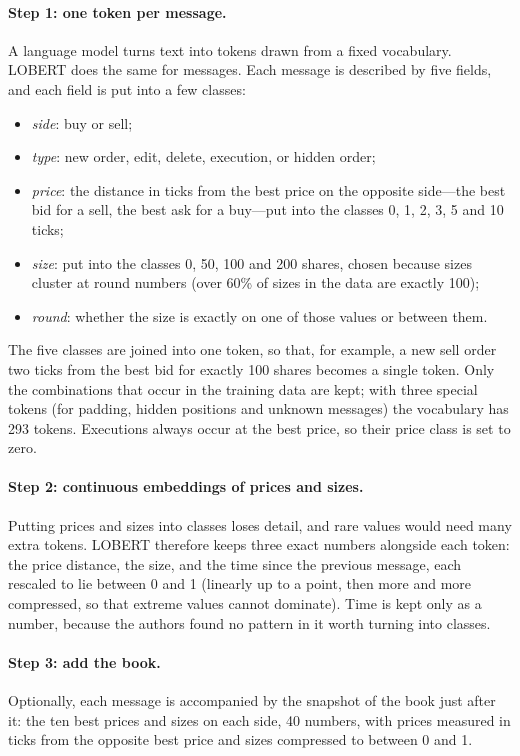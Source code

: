 \paragraph{Step 1: one token per message.} A language model turns text into tokens drawn from a fixed vocabulary.
LOBERT does the same for messages. Each message is described by five fields, and each field is put into a few
classes:
\begin{itemize}[leftmargin=1.5em,itemsep=1pt]
\item \emph{side}: buy or sell;
\item \emph{type}: new order, edit, delete, execution, or hidden order;
\item \emph{price}: the distance in ticks from the best price on the opposite side---the best bid for a sell, the
  best ask for a buy---put into the classes 0, 1, 2, 3, 5 and 10 ticks;
\item \emph{size}: put into the classes 0, 50, 100 and 200 shares, chosen because sizes cluster at round numbers (over
  60\% of sizes in the data are exactly 100);
\item \emph{round}: whether the size is exactly on one of those values or between them.
\end{itemize}
The five classes are joined into one token, so that, for example, a new sell order two ticks from the best bid for
exactly 100 shares becomes a single token. Only the combinations that occur in the training data are kept; with three
special tokens (for padding, hidden positions and unknown messages) the vocabulary has 293 tokens. Executions always
occur at the best price, so their price class is set to zero.

\paragraph{Step 2: continuous embeddings of prices and sizes.} Putting prices and sizes into classes loses detail, and rare values
would need many extra tokens. LOBERT therefore keeps three exact numbers alongside each token: the price distance, the
size, and the time since the previous message, each rescaled to lie between 0 and 1 (linearly up to a point, then
more and more compressed, so that extreme values cannot dominate). Time is kept only as a number, because the authors
found no pattern in it worth turning into classes.

\paragraph{Step 3: add the book.} Optionally, each message is accompanied by the snapshot of the book just after it:
the ten best prices and sizes on each side, 40 numbers, with prices measured in ticks from the opposite best price and
sizes compressed to between 0 and 1.

